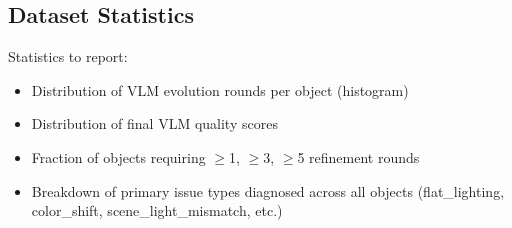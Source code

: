 \subsection{Dataset Statistics}
\label{sec:dataset:stats}

Statistics to report:
\begin{itemize}
  \item Distribution of VLM evolution rounds per object (histogram)
  \item Distribution of final VLM quality scores
  \item Fraction of objects requiring $\geq$1, $\geq$3, $\geq$5 refinement rounds
  \item Breakdown of primary issue types diagnosed across all objects
    (flat\_lighting, color\_shift, scene\_light\_mismatch, etc.)
\end{itemize}
